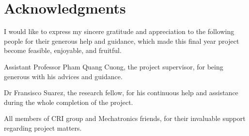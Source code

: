 \chapter*{Acknowledgments}

I would like to express my sincere gratitude and appreciation to the following people for their generous help and guidance, which made this final year project become feasible, enjoyable, and fruitful. 

Assistant Professor Pham Quang Cuong, the project supervisor, for being generous with his advices and guidance.

Dr Fransisco Suarez, the research fellow, for his continuous help and assistance during the whole completion of the project.

All members of CRI group and Mechatronics friends, for their invaluable support regarding project matters.


